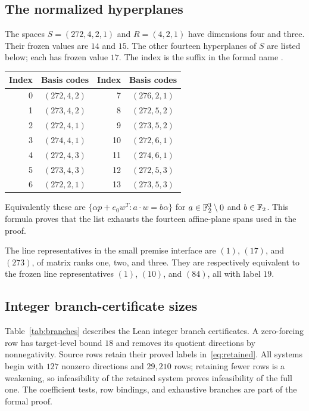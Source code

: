 \subsection{The normalized hyperplanes}
The spaces $S=(272,4,2,1)$ and $R=(4,2,1)$ have dimensions four
and three. Their frozen values are $14$ and $15$. The other fourteen
hyperplanes of $S$ are listed below; each has frozen value $17$.
The index is the suffix in the formal name .
\begin{center}
\begin{tabular}{rc@{\qquad}rc}
\toprule
Index & Basis codes & Index & Basis codes\\
\midrule
0 & $(272,4,2)$ & 7 & $(276,2,1)$\\
1 & $(273,4,2)$ & 8 & $(272,5,2)$\\
2 & $(272,4,1)$ & 9 & $(273,5,2)$\\
3 & $(274,4,1)$ & 10 & $(272,6,1)$\\
4 & $(272,4,3)$ & 11 & $(274,6,1)$\\
5 & $(273,4,3)$ & 12 & $(272,5,3)$\\
6 & $(272,2,1)$ & 13 & $(273,5,3)$\\
\bottomrule
\end{tabular}
\end{center}
Equivalently these are
$\{\alpha p+e_0w^T:a\cdot w=b\alpha\}$ for
$a\in\mathbb F_2^3\setminus0$ and $b\in\mathbb F_2$. This formula proves that
the list exhausts the fourteen affine-plane spans used in the proof.

The line representatives in the small premise interface are
$(1)$, $(17)$, and $(273)$, of matrix ranks one, two, and three.
They are respectively equivalent to the frozen line representatives
$(1)$, $(10)$, and $(84)$, all with label $19$.

\subsection{Integer branch-certificate sizes}
Table~\ref{tab:branches} describes the Lean integer branch certificates.
A zero-forcing row has target-level
bound $18$ and removes its quotient directions by nonnegativity.
Source rows retain their proved labels in~\eqref{eq:retained}.
All systems begin with $127$ nonzero directions and $29{,}210$ rows;
retaining fewer rows is a weakening, so infeasibility of the retained
system proves infeasibility of the full one. The coefficient tests,
row bindings, and exhaustive branches are part of the formal proof.


